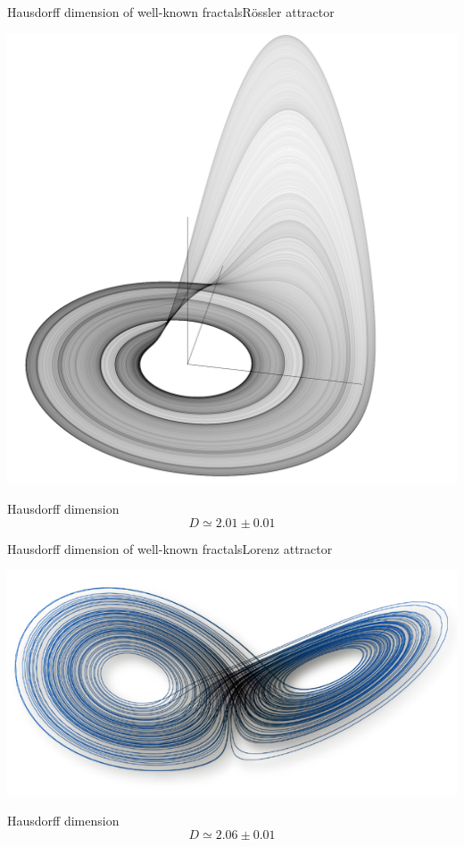\documentclass[usenames,dvipsnames,svgnames,10pt,aspectratio=169]{beamer}
\begin{document}
\begin{frame}[t, c]{Hausdorff dimension of well-known fractals}{R\"ossler attractor}
	\begin{minipage}{.48\textwidth}
		\centering
		\includegraphics[width=.8\columnwidth]{Roessler_attractor}
	\end{minipage}%
	\hfill
	\begin{minipage}{.48\textwidth}
		\centering
		Hausdorff dimension
		$$
		D \simeq 2.01 \pm 0.01
		$$
	\end{minipage}

	\vspace{1cm}
\end{frame}

\begin{frame}[t, c]{Hausdorff dimension of well-known fractals}{Lorenz attractor}
	\begin{minipage}{.48\textwidth}
		\centering
		\includegraphics[width=.8\columnwidth]{cover}
	\end{minipage}%
	\hfill
	\begin{minipage}{.48\textwidth}
		\centering
		Hausdorff dimension
		$$
		D \simeq 2.06 \pm 0.01
		$$
	\end{minipage}

	\vspace{1cm}
\end{frame}
\end{document}
